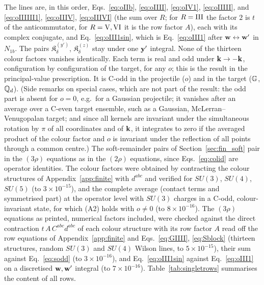 The lines are, in this order, Eqs.~\eqref{eq:oIIb}, \eqref{eq:oIIII}, \eqref{eq:oIV1}, \eqref{eq:oIIIII}, and \eqref{eq:oIIIIII1}, \eqref{eq:oIIIV}, \eqref{eq:oIIIVI} (the sum over $R$; for $R={\rm III}$ the factor $2$ is $t$ of the anticommutator, for $R={\rm V,VI}$ it is the row factor $A$), each with its complex conjugate, and Eq.~\eqref{eq:oIII1sin}, which is Eq.~\eqref{eq:oIII1} after $\mathbf{w}\leftrightarrow\mathbf{w}'$ in $N_{1b}$. The pairs $\mathfrak K^{(y')}_\delta$, $\mathfrak K^{(z)}_\delta$ stay under one $\mathbf{y}'$ integral. None of the thirteen colour factors vanishes identically. Each term is real and odd under $\mathbf{k}\to-\mathbf{k}$, configuration by configuration of the target, for any $o$; this is the result in the principal-value prescription. It is C-odd in the projectile ($o$) and in the target ($\mathbb{G}$, $\mathbb{Q}_d$). (Side remarks on special cases, which are not part of the result: the odd part is absent for $o=0$, e.g.\ for a Gaussian projectile; it vanishes after an average over a C-even target ensemble, such as a Gaussian, McLerran--Venugopalan target; and since all kernels are invariant under the simultaneous rotation by $\pi$ of all coordinates and of $\mathbf{k}$, it integrates to zero if the averaged product of the colour factor and $o$ is invariant under the reflection of all points through a common centre.) The soft-remainder pairs of Section~\ref{sec:fin_soft} pair in the $(3\rho)$ equations as in the $(2\rho)$ equations, since Eqs.~\eqref{eq:colid} are operator identities. The colour factors were obtained by contracting the colour structures of Appendix~\ref{app:finite} with $d^{abc}$ and verified for $SU(3)$, $SU(4)$, $SU(5)$ (to $3\times10^{-15}$), and the complete average (contact terms and symmetrised part) at the operator level with $SU(3)$ charges in a C-odd, colour-invariant state, for which (A2) holds with $o\neq0$ (to $8\times10^{-16}$). The $(3\rho)$ equations as printed, numerical factors included, were checked against the direct contraction $t\,A\,C^{abc}d^{abc}$ of each colour structure with its row factor $A$ read off the row equations of Appendix~\ref{app:finite} and Eqs.~\eqref{eq:GIIII}, \eqref{eq:Sblock} (thirteen structures, random $SU(3)$ and $SU(4)$ Wilson lines, to $5\times10^{-15}$), their sum against Eq.~\eqref{eq:sodd} (to $3\times10^{-16}$), and Eq.~\eqref{eq:oIII1sin} against Eq.~\eqref{eq:oIII1} on a discretised $\mathbf{w},\mathbf{w}'$ integral (to $7\times10^{-16}$). Table~\ref{tab:singletrows} summarises the content of all rows.

